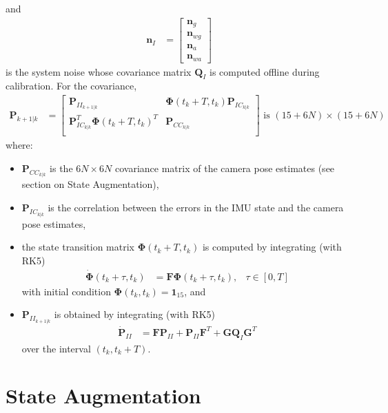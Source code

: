 \documentclass[10pt,letterpaper,fleqn,oneside]{article}
\newcommand{\nl}{\\[0.5em]}
\def\Vec#1{\mathbf{#1}} %
\newcommand{\bbm}{\begin{bmatrix}}
\newcommand{\ebm}{\end{bmatrix}}
\begin{document}
and
\begin{align}
\Vec{n}_I &= \bbm \Vec{n}_g \nl \Vec{n}_{wg} \nl \Vec{n}_a \nl \Vec{n}_{wa} \ebm
\end{align}
is the system noise whose covariance matrix $\Vec{Q}_I$ is computed offline during calibration.
\newpage\noindent
For the covariance,
\begin{align}
\Vec{P}_{k+1 | k} &= \bbm	\Vec{P}_{II_{k+1|k}} & \boldsymbol{\Phi}\left(t_k + T, t_k\right)\Vec{P}_{IC_{k|k}}\nl
											\Vec{P}_{IC_{k|k}}^T\boldsymbol{\Phi}\left(t_k + T, t_k\right)^T & \Vec{P}_{CC_{k|k}}\nl
								\ebm \text{ is }\left(15 + 6N\right)\times\left(15 + 6N\right)
\end{align}
where:
\begin{itemize}
\item $\Vec{P}_{CC_{k|k}}$ is the $6N\times6N$ covariance matrix of the camera pose estimates (see section on State Augmentation), 
\item $\Vec{P}_{IC_{k|k}}$ is the correlation between the errors in the IMU state and the camera pose estimates,
\item the state transition matrix $\boldsymbol{\Phi}\left(t_k + T, t_k\right)$ is computed by integrating (with RK5)
\begin{align}
\dot{\boldsymbol{\Phi}}\left(t_k + \tau, t_k\right) &= \Vec{F}\boldsymbol{\Phi}\left(t_k + \tau, t_k\right), &\tau\in\left[0,T\right]
\end{align}
with initial condition $\boldsymbol{\Phi}\left(t_k, t_k\right) = \Vec{1}_{15}$, and
\item $\Vec{P}_{II_{k+1|k}}$ is obtained by integrating (with RK5)
\begin{align}
\dot{\Vec{P}}_{II} &= \Vec{F}\Vec{P}_{II} + \Vec{P}_{II}\Vec{F}^T + \Vec{G}\Vec{Q}_I\Vec{G}^T
\end{align}
over the interval $\left(t_k, t_k+T\right)$.
\end{itemize}

\section{State Augmentation}
\end{document}

